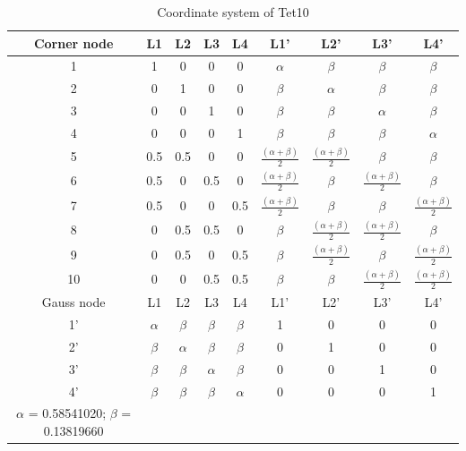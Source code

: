 \begin{table}
	\centering
	\caption{Coordinate system of Tet10} \label{tab: Tet10}
	\begin{tabular}{ccccccccc}			
		\hline
		Corner node\centering& L1& L2& L3& L4& L1'& L2'& L3'& L4'\\ \hline
		1\centering& 1& 0& 0& 0& $\alpha$& $\beta$& $\beta$& $\beta$\\
		2\centering& 0& 1& 0& 0& $\beta$& $\alpha$& $\beta$& $\beta$\\
		3\centering& 0& 0& 1& 0& $\beta$& $\beta$& $\alpha$& $\beta$\\
		4\centering& 0& 0& 0& 1& $\beta$& $\beta$& $\beta$& $\alpha$\\
		5\centering& 0.5& 0.5& 0& 0& $\frac{(\alpha+\beta)}{2}$& $\frac{(\alpha+\beta)}{2}$& $\beta$& $\beta$\\
		6\centering& 0.5& 0& 0.5& 0& $\frac{(\alpha+\beta)}{2}$& $\beta$& $\frac{(\alpha+\beta)}{2}$& $\beta$\\
		7\centering& 0.5& 0& 0& 0.5& $\frac{(\alpha+\beta)}{2}$& $\beta$& $\beta$& $\frac{(\alpha+\beta)}{2}$\\
		8\centering& 0& 0.5& 0.5& 0& $\beta$& $\frac{(\alpha+\beta)}{2}$& $\frac{(\alpha+\beta)}{2}$& $\beta$\\
		9\centering& 0& 0.5& 0& 0.5& $\beta$& $\frac{(\alpha+\beta)}{2}$& $\beta$& $\frac{(\alpha+\beta)}{2}$\\
		10\centering& 0& 0& 0.5& 0.5& $\beta$& $\beta$& $\frac{(\alpha+\beta)}{2}$& $\frac{(\alpha+\beta)}{2}$\\
		\hline
		Gauss node\centering& L1& L2& L3& L4& L1'& L2'& L3'& L4' \\ \hline
		1'\centering& $\alpha$& $\beta$& $\beta$& $\beta$& 1& 0& 0& 0  \\
		2'\centering&$\beta$ & $\alpha$& $\beta$& $\beta$& 0& 1& 0& 0 \\
		3'\centering& $\beta$& $\beta$& $\alpha$& $\beta$& 0& 0& 1& 0\\
		4'\centering& $\beta$& $\beta$& $\beta$& $\alpha$& 0& 0& 0& 1\\
		\hline
		$\alpha$ = 0.58541020; $\beta$ = 0.13819660&&&&&&&&\\
		\hline 		    
	\end{tabular}	
\end{table}		

